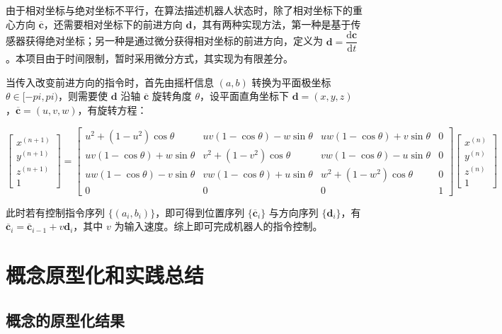 \documentclass[a4paper]{ctexart}
\numberwithin{equation}{section}
\numberwithin{table}{section}
\numberwithin{figure}{section}
\begin{document}
由于相对坐标与绝对坐标不平行，在算法描述机器人状态时，除了相对坐标下的重心方向 $\overline{\boldsymbol c}$，还需要相对坐标下的前进方向 $\boldsymbol d$，其有两种实现方法，第一种是基于传感器获得绝对坐标；另一种是通过微分获得相对坐标的前进方向，定义为 $\boldsymbol d=\dfrac{\mathrm d\boldsymbol c}{\mathrm d t}$。本项目由于时间限制，暂时采用微分方式，其实现为有限差分。

当传入改变前进方向的指令时，首先由摇杆信息 $(a,b)$ 转换为平面极坐标 $\theta \in [-pi,pi)$，则需要使 $\boldsymbol d$ 沿轴 $\overline{\boldsymbol c}$ 旋转角度 $\theta$，设平面直角坐标下 $\boldsymbol d=(x,y,z)$，$\overline{\boldsymbol c}=(u,v,w)$，有旋转方程：

\begin{equation}
  \begin{bmatrix}
    x^{(n+1)} \\
    y^{(n+1)} \\
    z^{(n+1)} \\
    1
  \end{bmatrix}
  =
  \begin{bmatrix}
    u^2+(1-u^2)\cos\theta & uv(1-\cos\theta)-w\sin\theta & uw(1-\cos\theta)+v\sin\theta & 0\\
    uv(1-\cos\theta)+w\sin\theta & v^2+(1-v^2)\cos\theta & vw(1-\cos\theta)-u\sin\theta & 0\\
    uw(1-\cos\theta)-v\sin\theta & vw(1-\cos\theta)+u\sin\theta & w^2+(1-w^2)\cos\theta & 0\\
    0 & 0 & 0 & 1
  \end{bmatrix}
  \begin{bmatrix}
    x^{(n)} \\
    y^{(n)} \\
    z^{(n)} \\
    1
  \end{bmatrix}
\end{equation}

此时若有控制指令序列 $\{(a_i,b_i)\}$，即可得到位置序列 $\{\overline{\boldsymbol c}_i\}$ 与方向序列 $\{\boldsymbol d_i\}$，有 $\overline{\boldsymbol c}_i = \overline{\boldsymbol c}_{i-1} + v\boldsymbol d_i$，其中 $v$ 为输入速度。综上即可完成机器人的指令控制。

\section{概念原型化和实践总结}

\subsection{概念的原型化结果}
\end{document}

